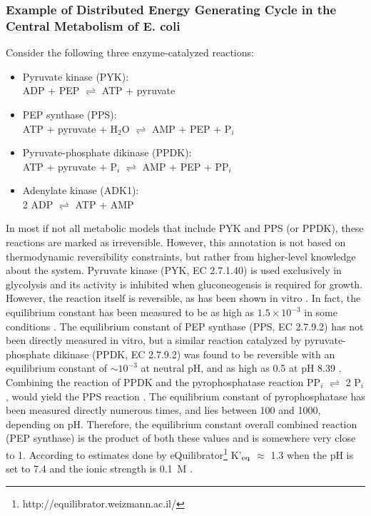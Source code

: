 \documentclass[twocolumn]{bmcart}%
\begin{document}
\subsubsection*{Example of Distributed Energy Generating Cycle in the Central Metabolism of E. coli}
Consider the following three enzyme-catalyzed reactions:
\begin{itemize}
	\item Pyruvate kinase (PYK):\\ADP + PEP $\rightleftharpoons$ ATP + pyruvate
	\item PEP synthase (PPS):\\ATP + pyruvate + H$_2$O $\rightleftharpoons$ AMP + PEP + P$_i$
	\item Pyruvate-phosphate dikinase (PPDK):\\ATP + pyruvate + P$_i$ $\rightleftharpoons$ AMP + PEP + PP$_i$
	\item Adenylate kinase (ADK1):\\2 ADP $\rightleftharpoons$ ATP + AMP
\end{itemize}
In most if not all metabolic models that include PYK and PPS (or PPDK), these reactions are marked as irreversible. However, this annotation is not based on thermodynamic reversibility constraints, but rather from higher-level knowledge about the system. Pyruvate kinase (PYK, EC 2.7.1.40) is used exclusively in glycolysis and its activity is inhibited when gluconeogensis is required for growth. However, the reaction itself is reversible, as has been shown in vitro \cite{Lardy1945-ze}. In fact, the equilibrium constant has been measured to be as high as $1.5 \times 10^{-3}$ in some conditions \cite{Krimsky1959-mt}. The equilibrium constant of PEP synthase (PPS, EC 2.7.9.2) has not been directly measured in vitro, but a similar reaction catalyzed by pyruvate-phosphate dikinase (PPDK, EC 2.7.9.2) was found to be reversible with an equilibrium constant of $\sim10^{-3}$ at neutral pH, and as high as 0.5 at pH 8.39 \cite{Reeves1968-mq}. Combining the reaction of PPDK and the pyrophosphatase reaction PP$_i$ $\rightleftharpoons$ 2 P$_i$, would yield the PPS reaction \cite{De_Meis1982-pe}. The equilibrium constant of pyrophosphatase has been measured directly numerous times, and lies between 100 and 1000, depending on pH. Therefore, the equilibrium constant overall combined reaction (PEP synthase) is the product of both these values and is somewhere very close to 1. According to estimates done by eQuilibrator\footnote{http://equilibrator.weizmann.ac.il/} K'$_{\rm eq}$ $\approx$ 1.3 when the pH is set to 7.4 and the ionic strength is 0.1~M \cite{Flamholz2011}.
\end{document}
